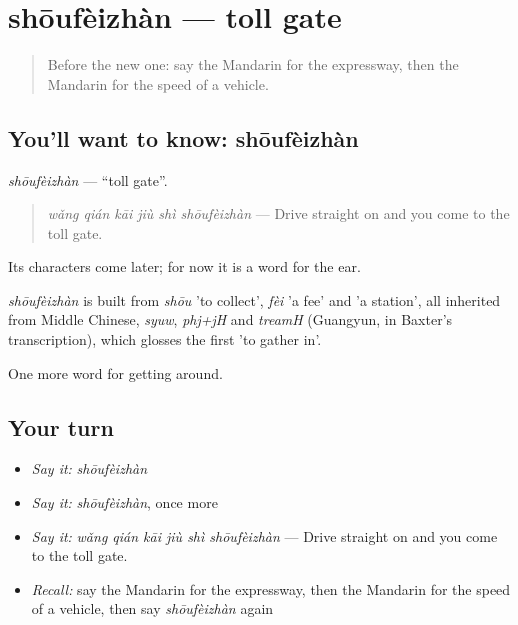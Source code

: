 \section[shōufèizhàn]{shōufèizhàn — toll gate}

\label{lesson:ZH-C421-shoufeizhan}



\begin{quote}
Before the new one: say the Mandarin for the expressway, then the Mandarin for the speed of a vehicle.
\end{quote}

\subsection*{You'll want to know: shōufèizhàn}
\emph{shōufèizhàn} — \textquotedblleft{}toll gate\textquotedblright{}.

\begin{quote}
\emph{wǎng qián kāi jiù shì shōufèizhàn} — Drive straight on and you come to the toll gate.
\end{quote}

Its characters come later; for now it is a word for the ear.

\begin{cousinweb}
\emph{shōufèizhàn} is built from \emph{shōu} 'to collect', \emph{fèi} 'a fee' and  'a station', all inherited from Middle Chinese, \emph{syuw}, \emph{phj+jH} and \emph{treamH} (Guangyun, in Baxter's transcription), which glosses the first 'to gather in'.
\end{cousinweb}

\begin{grammarlens}[title={What you've built}]
One more word for getting around.
\end{grammarlens}

\subsection*{Your turn}
\begin{itemize}
\raggedright
  \item \emph{Say it:} \emph{shōufèizhàn}
  \item \emph{Say it:} \emph{shōufèizhàn}, once more
  \item \emph{Say it:} \emph{wǎng qián kāi jiù shì shōufèizhàn} — Drive straight on and you come to the toll gate.
  \item \emph{Recall:} say the Mandarin for the expressway, then the Mandarin for the speed of a vehicle, then say \emph{shōufèizhàn} again
\end{itemize}


